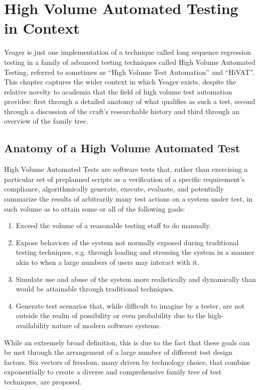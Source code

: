 \chapter{High Volume Automated Testing in Context}
Yeager is just one implementation of a technique called long sequence regression testing in a family of advanced testing techniques called High Volume Automated Testing, referred to sometimes as ``High Volume Test Automation'' and ``HiVAT''. This chapter captures the wider context in which Yeager exists, despite the relative novelty to academia that the field of high volume test automation provides: first through a detailed anatomy of what qualifies as such a test, second through a discussion of the craft's researchable history and third through an overview of the family tree.

\section{Anatomy of a High Volume Automated Test}
High Volume Automated Tests are software tests that, rather than exercising a particular set of preplanned scripts as a verification of a specific requirement's compliance, algorithmically generate, execute, evaluate, and potentially summarize the results of arbitrarily many test actions on a system under test, in such volume as to attain some or all of the following goals:
\begin{enumerate}
\item Exceed the volume of a reasonable testing staff to do manually.
\item Expose behaviors of the system not normally exposed during traditional testing techniques, e.g. through loading and stressing the system in a manner akin to when a large numbers of users may interact with it.
\item Simulate use and abuse of the system more realistically and dynamically than would be attainable through traditional techniques.
\item Generate test scenarios that, while difficult to imagine by a tester, are not outside the realm of possibility or even probability due to the high-availability nature of modern software systems.
\end{enumerate}

While an extremely broad definition, this is due to the fact that these goals can be met through the arrangement of a large number of different test design factors. Six vectors of freedom, many driven by technology choice, that combine exponentially to create a diverse and comprehensive family tree of test techniques, are proposed.

